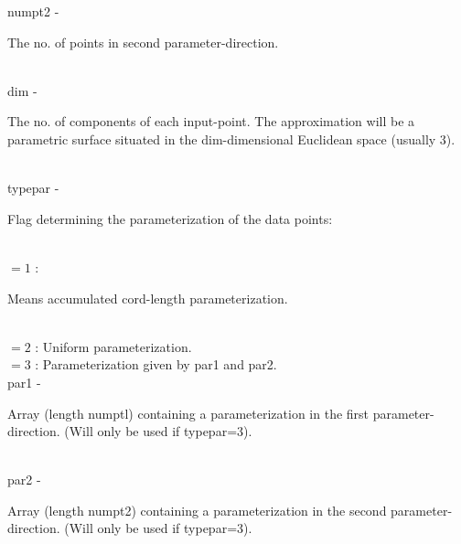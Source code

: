         \>\>    {\fov numpt2}\> - \>    \begin{minipg2}
                                The no. of points in second parameter-direction.
                                \end{minipg2}\\
        \>\>    {\fov dim}      \> - \> \begin{minipg2}
                                The no. of components of each input-point. The
                                approximation will be a parametric surface situated in
                                the {\fov dim}-dimensional Euclidean
                                space (usually 3).
                                \end{minipg2}\\[0.3ex]
        \>\>    {\fov typepar}\> - \>   \begin{minipg2}
                                Flag determining the para\-meterization of the data
                                points:
                                \end{minipg2} \\[0.3ex]
                \>\>\>\>\>      $= 1$ :\>       \begin{minipg5}
                                                Means accumulated cord-length
                                                  para\-meterization.
                                        \end{minipg5}\\[0.8ex]
                \>\>\>\>\>      $= 2$ : \>Uniform parameterization.\\
                \>\>\>\>\>      $= 3$ : \>Parameterization given by par1 and par2.\\
        \>\>    {\fov par1}\> - \>      \begin{minipg2}
                                Array (length numptl) containing a parameterization in
                                the first parameter-direction. (Will only be used if
                                typepar=3).
                                \end{minipg2}\\[0.3ex]
        \>\>    {\fov par2}\> - \>      \begin{minipg2}
                                Array (length numpt2) containing a parameterization in
                                the second parameter-direction. (Will only be used if
                                typepar=3).
                                \end{minipg2}\\[0.3ex]

